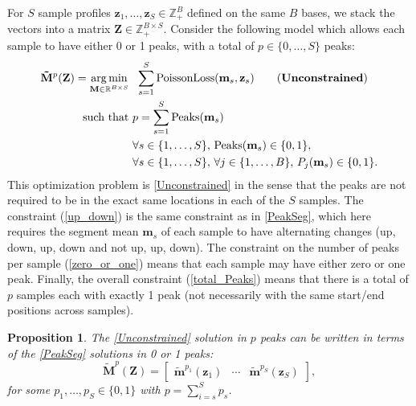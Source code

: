 \documentclass{article} %
\newtheorem{proposition}{Proposition}
\DeclareMathOperator*{\argmin}{arg\,min}
\DeclareMathOperator*{\Peaks}{Peaks}
\newcommand{\RR}{\mathbb R}
\newcommand{\ZZ}{\mathbb Z}
\begin{document}
For $S$ sample profiles $\mathbf z_1, \dots, \mathbf z_S\in\ZZ_+^B$
defined on the same $B$ bases, we stack the vectors into a matrix
$\mathbf Z\in\ZZ_+^{B \times S}$. Consider the following model which
allows each sample to have either 0 or 1 peaks, with a total of
$p\in\{0, \dots, S\}$ peaks:
\begin{align}
  \label{Unconstrained}
  \mathbf{\tilde M}^p(\mathbf Z)  =
  \argmin_{\mathbf M\in\RR^{B\times S}} &\ \ 
  \sum_{s=1}^S 
  \text{PoissonLoss}(\mathbf m_s, \mathbf z_s) 
  \tag{\textbf{Unconstrained}}
  \\
  \text{such that} &\ p = \sum_{s=1}^S \Peaks(\mathbf m_s)
  \label{total_Peaks}
  \\
  &\ \forall s\in\{1, \dots, S\},\, 
  \Peaks(\mathbf m_s)\in\{0, 1\},  
  \label{zero_or_one}
  \\
  &\ \forall s\in\{1, \dots, S\},\, 
  \forall j\in\{1, \dots, B\},\, P_j(\mathbf m_s) \in\{0, 1\}.
  \label{up_down}
\end{align}
This optimization problem is \ref{Unconstrained} in the sense that the
peaks are not required to be in the exact same locations in each of
the $S$ samples. The constraint (\ref{up_down}) is the same constraint
as in \ref{PeakSeg}, which here requires the segment mean $\mathbf
m_s$ of each sample to have alternating changes (up, down, up, down
and not up, up, down). The constraint on the number of peaks per
sample (\ref{zero_or_one}) means that each sample may have either zero
or one peak. Finally, the overall constraint (\ref{total_Peaks}) means
that there is a total of $p$ samples each with exactly 1 peak (not
necessarily with the same start/end positions across samples).

\begin{proposition}
The \ref{Unconstrained} solution in $p$ peaks
can be written in terms of the \ref{PeakSeg} solutions in 0 or 1 peaks:
\begin{equation}
  \label{eq:unconstrained_PeakSeg}
  \mathbf{\tilde M}^p(\mathbf Z) = \left[
    \begin{array}{ccc}
      \mathbf{\tilde m}^{p_1}(\mathbf z_1) & 
      \cdots &
      \mathbf{\tilde m}^{p_S}(\mathbf z_S) 
    \end{array}
  \right],
\end{equation}
for some $p_1,\dots, p_S\in\{0, 1\}$ with $p=\sum_{i=s}^S p_s$.
\end{proposition}
\end{document}
